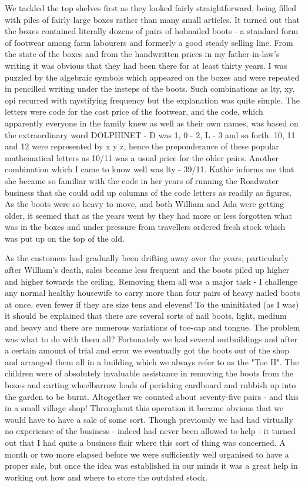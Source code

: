 We tackled the top shelves first as they looked fairly straightforward, being filled with piles of fairly large boxes rather than many small articles. It turned out that the boxes contained literally dozens of pairs of hobnailed boots - a standard form of footwear among farm labourers and formerly a good steady selling line. From the state of the boxes and from the handwritten prices in my father-in-law's writing it was obvious that they had been there for at least thirty years. I was puzzled by the algebraic symbols which appeared on the boxes and were repeated in pencilled writing under the insteps of the boots. Such combinations as lty, xy, opi recurred with mystifying frequency but the explanation was quite simple. The letters were code for the cost price of the footwear, and the code, which apparently everyone in the family knew as well as their own names, was based on the extraordinary word DOLPHINET - D was 1, 0 - 2, L - 3 and so forth. 10, 11 and 12 were represented by x y z, hence the preponderance of these popular mathematical letters as 10/11 was a usual price for the older pairs. Another combination which I came to know well was lty - 39/11. Kathie informs me that she became so familiar with the code in her years of running the Roadwater business that she could add up columns of the code letters as readily as figures. As the boots were so heavy to move, and both William and Ada were getting older, it seemed that as the years went by they had more or less forgotten what was in the boxes and under pressure from travellers ordered fresh stock which was put up on the top of the old.

As the customers had gradually been drifting away over the years, particularly after William's death, sales became less frequent and the boots piled up higher and higher towards the ceiling. Removing them all was a major task - I challenge any normal healthy housewife to carry more than four pairs of heavy nailed boots at once, even fewer if they are size tens and elevens! To the uninitiated (as I was) it should be explained that there are several sorts of	nail boots, light, medium and heavy and there are numerous variations of toe-cap and tongue. The problem was what to do with them all? Fortunately we had several outbuildings and after a certain amount of trial and error we eventually got the boots out of the shop and arranged them all in a building which we always refer to as the "Toe H". The children were of absolutely invaluable assistance in removing the boots from the boxes and carting wheelbarrow loads of perishing cardboard and rubbish up into the garden to be burnt. Altogether we counted about seventy-five pairs - and this in a small village shop! Throughout this operation it became obvious that we would have to have a sale of some sort. Though previously	we had had virtually no experience of the business - indeed had never been allowed to help - it turned out that I had quite a business flair where this sort of thing was concerned. A month or two more elapsed before we were sufficiently well organised to have a proper sale, but once the idea was established in our minds it was a great help in working out how and where to store the outdated stock.

